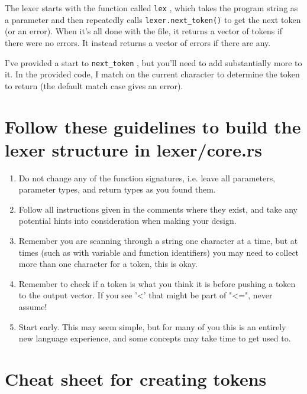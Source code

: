 \documentclass[
	12pt, %
]{fphw}
\newcommand{\code}[1]{%
  \lstinline[basicstyle=\footnotesize\ttfamily]$#1$%
}
\begin{document}
The lexer starts with the function called \code{lex}, which takes the program string
as a parameter and then repeatedly calls \code{lexer.next_token()} to get the next
token (or an error).  When it's all done with the file, it returns a vector of
tokens if there were no errors. It instead returns a vector of errors if there
are any.

I've provided a start to \code{next_token}, but you'll need to add
substantially more to it.  In the provided code, I match on the current
character to determine the token to return (the default match case gives an error).

\pagebreak

\section*{Follow these guidelines to build the lexer structure in lexer/core.rs}

\begin{problem}
    \begin{enumerate}
        \item Do not change any of the function signatures, i.e. leave all parameters, parameter types, and return types as you found them.
        \item Follow all instructions given in the comments where they exist, and take any potential hints into consideration when making your design.
        \item Remember you are scanning through a string one character at a time, but at times (such as with variable and function identifiers) you may need to collect more than one character for a token, this is okay.
        \item Remember to check if a token is what you think it is before pushing a token to the output vector. If you see '<' that might be part of "<=", never assume!
        \item Start early. This may seem simple, but for many of you this is an entirely new language experience, and some concepts may take time to get used to.
        
    \end{enumerate}
\end{problem}

\section*{Cheat sheet for creating tokens}
\end{document}
